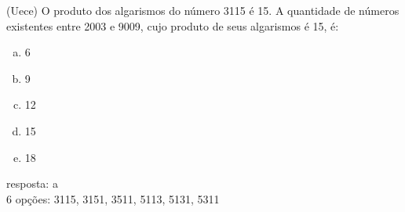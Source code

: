 \begin{ex}
(Uece) O produto dos algarismos do número 3115 é 15. A quantidade de números existentes entre 2003 e 9009, cujo produto de seus algarismos é 15, é:
   \begin{enumerate}[(a)]
   \item 6
   \item 9
   \item 12
   \item 15
   \item 18
   \end{enumerate}
   \begin{sol}
     resposta: a \\
     6 opções: 3115, 3151, 3511, 5113, 5131, 5311
   \end{sol}
\end{ex}